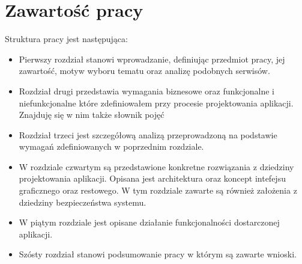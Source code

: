 \section{Zawartość pracy}
\label{sec:zawartoscPracy}
Struktura pracy jest następująca:
\begin{itemize}
\item Pierwszy rozdział stanowi wprowadzanie, definiując przedmiot pracy, jej zawartość,  motyw wyboru tematu oraz analizę podobnych serwisów. 
\item Rozdział drugi przedstawia wymagania biznesowe oraz funkcjonalne i niefunkcjonalne które zdefiniowałem przy procesie projektowania aplikacji. Znajduję się w nim także słownik pojęć 
\item Rozdział trzeci jest szczegółową analizą przeprowadzoną na podstawie wymagań zdefiniowanych w poprzednim rozdziale. 
\item W rozdziale czwartym są przedstawione konkretne rozwiązania z dziedziny projektowania aplikacji. Opisana jest architektura oraz koncept intefejsu graficznego oraz restowego. W tym rozdziale zawarte są również założenia z dziedziny bezpieczeństwa systemu. 
\item W piątym rozdziale jest opisane działanie funkcjonalności dostarczonej aplikacji. 
\item Szósty rozdział stanowi podsumowanie pracy w którym są zawarte wnioski.
\end{itemize}


